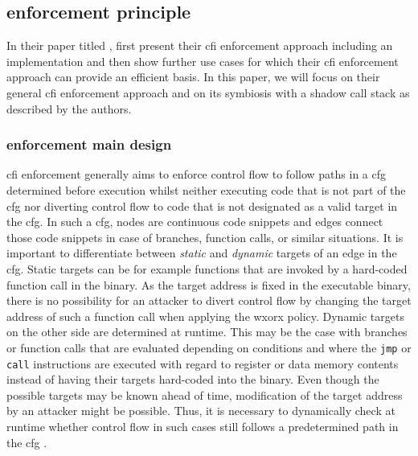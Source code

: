 \subsection{ enforcement principle}
\label{subsec:cfi-principle}

In their \citeyear{Abadi2005} paper titled , \citeauthor{Abadi2005} first present their \gls{cfi} enforcement approach including an implementation and then show further use cases for which their \gls{cfi} enforcement approach can provide an efficient basis.
In this paper, we will focus on their general \gls{cfi} enforcement approach and on its symbiosis with a shadow call stack as described by the authors.

\subsubsection{ enforcement main design}
\label{subsubsec:cfi-main-design}

\Gls{cfi} enforcement generally aims to enforce control flow to follow paths in a \gls{cfg} determined before execution whilst neither executing code that is not part of the \gls{cfg} nor diverting control flow to code that is not designated as a valid target in the \gls{cfg}.
In such a \gls{cfg}, nodes are continuous code snippets and edges connect those code snippets in case of branches, function calls, or similar situations.
It is important to differentiate between \emph{static} and \emph{dynamic} targets of an edge in the \gls{cfg}.
Static targets can be for example functions that are invoked by a hard-coded function call in the binary.
As the target address is fixed in the executable binary, there is no possibility for an attacker to divert control flow by changing the target address of such a function call when applying the \gls{wxorx} policy.
Dynamic targets on the other side are determined at runtime.
This may be the case with branches or function calls that are evaluated depending on conditions and where the \texttt{jmp} or \texttt{call} instructions are executed with regard to register or data memory contents instead of having their targets hard-coded into the binary.
Even though the possible targets may be known ahead of time, modification of the target address by an attacker might be possible.
Thus, it is necessary to dynamically check at runtime whether control flow in such cases still follows a predetermined path in the \gls{cfg} \cite[340\psq, 343]{Abadi2005}.

